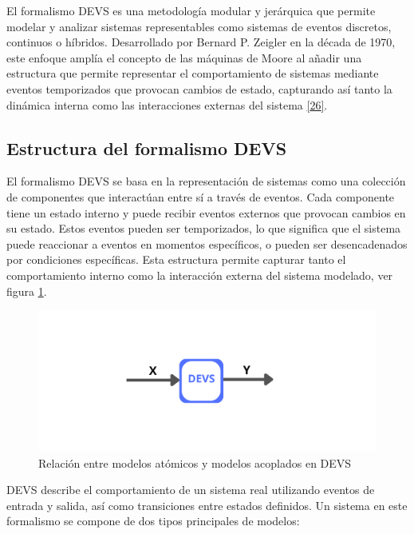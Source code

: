 \documentclass[12pt,oneside]{templates/unerthesis}
\begin{document}
El formalismo DEVS es una metodología modular y jerárquica que permite modelar y analizar sistemas representables como sistemas de eventos discretos, continuos o híbridos. Desarrollado por Bernard P. Zeigler en la década de 1970, este enfoque amplía el concepto de las máquinas de Moore al añadir una estructura que permite representar el comportamiento de sistemas mediante eventos temporizados que provocan cambios de estado, capturando así tanto la dinámica interna como las interacciones externas del sistema \protect\hyperlink{ref-zeigler_theory_2000}{{[}26{]}}.

\hypertarget{estructura-del-formalismo-devs}{%
\subsection{Estructura del formalismo DEVS}\label{estructura-del-formalismo-devs}}

El formalismo DEVS se basa en la representación de sistemas como una colección de componentes que interactúan entre sí a través de eventos. Cada componente tiene un estado interno y puede recibir eventos externos que provocan cambios en su estado. Estos eventos pueden ser temporizados, lo que significa que el sistema puede reaccionar a eventos en momentos específicos, o pueden ser desencadenados por condiciones específicas.
Esta estructura permite capturar tanto el comportamiento interno como la interacción externa del sistema modelado, ver figura \ref{fig:devs}.

\begin{figure}

{\centering \includegraphics[width=1\linewidth]{images/devs} 

}

\caption{Relación entre modelos atómicos y modelos acoplados en DEVS}\label{fig:devs}
\end{figure}

DEVS describe el comportamiento de un sistema real utilizando eventos de entrada y salida, así como transiciones entre estados definidos. Un sistema en este formalismo se compone de dos tipos principales de modelos:
\end{document}
